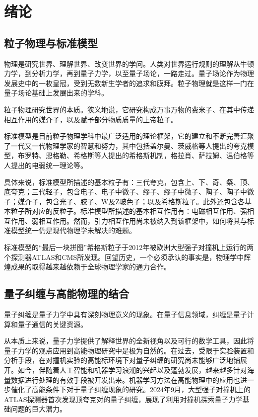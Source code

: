 \chapter{绪论}
\label{chap:introduction}

\section{粒子物理与标准模型}
\label{sec:onepone}

物理是研究世界、理解世界、改变世界的学问。人类对世界运行规则的理解从牛顿力学，到分析力学，再到量子力学，以至量子场论，一路走过。量子场论作为物理发展史中的一枚皇冠，受到无数新生学者的追求和膜拜。粒子物理就是这样一门在量子场论基础上发展出来的学科。

粒子物理研究世界的本质。狭义地说，它研究构成万事万物的费米子、在其中传递相互作用的媒介子，以及赋予部分物质质量的上帝粒子。

标准模型是目前粒子物理学科中最广泛适用的理论框架，它的建立和不断完善汇聚了一代又一代物理学家的智慧和努力，其中包括盖尔曼、茨威格等人提出的夸克模型\cite{ref1g}，布罗特、恩格勒、希格斯等人提出的希格斯机制\cite{ref2e, ref2h}，格拉肖、萨拉姆、温伯格等人提出的电弱统一理论\cite{ref3g, ref3s, ref3w}等。

具体来说，标准模型所描述的基本粒子有：三代夸克，包含上、下、奇、粲、顶、底夸克；三代轻子，包含电子、电子中微子、缪子、缪子中微子、陶子、陶子中微子；媒介子，包含光子、胶子、W及Z玻色子；以及希格斯粒子。此外还包含各基本粒子所对应的反粒子。标准模型所描述的基本相互作用有：电磁相互作用、强相互作用、弱相互作用。然而，引力相互作用尚未被纳入到该框架中，如何将其与标准模型统一仍是现代物理学未解决的难题。

标准模型的“最后一块拼图”希格斯粒子于2012年被欧洲大型强子对撞机上运行的两个探测器ATLAS\cite{ref4}和CMS\cite{ref5}所发现。回望历史，一个必须承认的事实是，物理学中辉煌成果的取得越来越依赖于全球物理学家的通力合作。

\section{量子纠缠与高能物理的结合}
\label{sec:oneptwo}

量子纠缠是量子力学中具有深刻物理意义的现象。在量子信息领域，纠缠是量子计算和量子通信的关键资源。

从本质上来说，量子力学提供了解释世界的全新视角以及可行的数学工具，因此将量子力学的观点应用到高能物理研究中是极为自然的。在过去，受限于实验装置和分析手段，在对撞机实验的高能标环境下对量子纠缠的研究尚未能够广泛地铺展开。如今，伴随着人工智能和机器学习浪潮的兴起以及蓬勃发展，越来越多针对海量数据进行处理的有效手段被开发出来。机器学习方法在高能物理中的应用也进一步催化了高能条件下对于量子纠缠现象的研究。2024年9月，大型强子对撞机上的ATLAS探测器首次发现顶夸克对的量子纠缠\cite{ref6}，展现了利用对撞机探索量子力学基础问题的巨大潜力。

